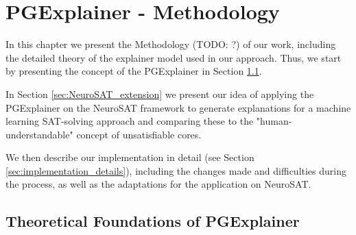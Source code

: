 \chapter{PGExplainer - Methodology}
\label{ch:PGExplainer}


In this chapter we present the Methodology (TODO: ?) of our work, including the detailed theory of the explainer model used in our approach. Thus, we start by presenting the concept of the PGExplainer \cite{luo2020parameterized} in Section \ref{sec:TheoryPGE}.

In Section \ref{sec:NeuroSAT_extension} we present our idea of applying the PGExplainer on the NeuroSAT framework to generate explanations for a machine learning SAT-solving approach and comparing these to the "human-understandable" concept of unsatisfiable cores. 

We then describe our implementation in detail (see Section \ref{sec:implementation_details}), including the changes made and difficulties during the process, as well as the adaptations for the application on NeuroSAT.

\section{Theoretical Foundations of PGExplainer}
\label{sec:TheoryPGE}

